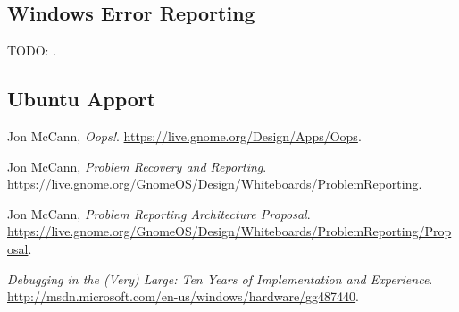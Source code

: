 \documentclass{article}
\begin{document}
\subsection{Windows Error Reporting}
TODO: \cite{MS}.

\subsection{Ubuntu Apport}


\cleardoublepage
\begin{thebibliography}{9}

  Jon McCann,
  \emph{Oops!}.
  \url{https://live.gnome.org/Design/Apps/Oops}.

  Jon McCann,
  \emph{Problem Recovery and Reporting}.
  \url{https://live.gnome.org/GnomeOS/Design/Whiteboards/ProblemReporting}.

  Jon McCann,
  \emph{Problem Reporting Architecture Proposal}.
  \url{https://live.gnome.org/GnomeOS/Design/Whiteboards/ProblemReporting/Proposal}.

  \emph{Debugging in the (Very) Large: Ten Years of Implementation and Experience}.
  \url{http://msdn.microsoft.com/en-us/windows/hardware/gg487440}.

\end{thebibliography}
\end{document}
